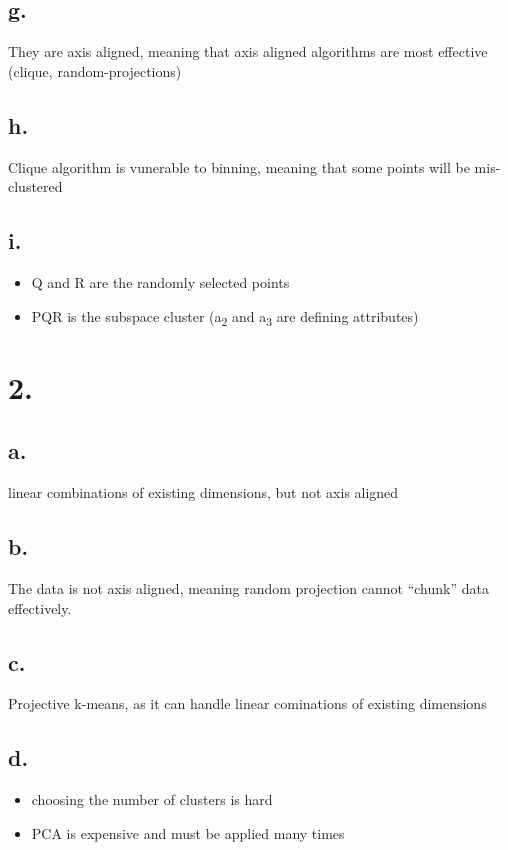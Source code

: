 \documentclass[11pt]{article}
\begin{document}
\subsection*{g.}
\label{sec:org46f0091}
They are axis aligned, meaning that axis aligned algorithms are most effective
(clique, random-projections)
\subsection*{h.}
\label{sec:org7f34e9c}
Clique algorithm is vunerable to binning, meaning that some points will be mis-clustered
\subsection*{i.}
\label{sec:orgc6b1e89}
\begin{itemize}
\item Q and R are the randomly selected points
\item PQR is the subspace cluster (a\textsubscript{2} and a\textsubscript{3} are defining attributes)
\end{itemize}

\section*{2.}
\label{sec:org6e6317a}
\subsection*{a.}
\label{sec:org654f747}
linear combinations of existing dimensions, but not axis aligned
\subsection*{b.}
\label{sec:orge17eb0a}
The data is not axis aligned, meaning random projection cannot ``chunk'' data
effectively.
\subsection*{c.}
\label{sec:org43ecbfd}
Projective k-means, as it can handle linear cominations of existing dimensions
\subsection*{d.}
\label{sec:org48e6dba}
\begin{itemize}
\item choosing the number of clusters is hard
\item PCA is expensive and must be applied many times
\end{itemize}
\end{document}
